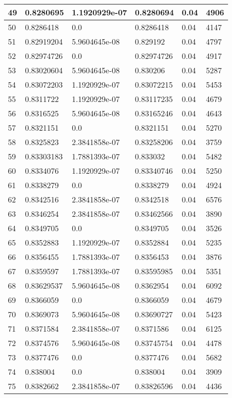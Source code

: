 \begin{longtable}{|l|l|l|l|l|l|}
49 & 0.8280695 & 1.1920929e-07 & 0.8280694 & 0.04 & 4906 \\ \hline 
50 & 0.8286418 & 0.0 & 0.8286418 & 0.04 & 4147 \\ \hline 
51 & 0.82919204 & 5.9604645e-08 & 0.829192 & 0.04 & 4797 \\ \hline 
52 & 0.82974726 & 0.0 & 0.82974726 & 0.04 & 4917 \\ \hline 
53 & 0.83020604 & 5.9604645e-08 & 0.830206 & 0.04 & 5287 \\ \hline 
54 & 0.83072203 & 1.1920929e-07 & 0.83072215 & 0.04 & 5453 \\ \hline 
55 & 0.8311722 & 1.1920929e-07 & 0.83117235 & 0.04 & 4679 \\ \hline 
56 & 0.8316525 & 5.9604645e-08 & 0.83165246 & 0.04 & 4643 \\ \hline 
57 & 0.8321151 & 0.0 & 0.8321151 & 0.04 & 5270 \\ \hline 
58 & 0.8325823 & 2.3841858e-07 & 0.83258206 & 0.04 & 3759 \\ \hline 
59 & 0.83303183 & 1.7881393e-07 & 0.833032 & 0.04 & 5482 \\ \hline 
60 & 0.8334076 & 1.1920929e-07 & 0.83340746 & 0.04 & 5250 \\ \hline 
61 & 0.8338279 & 0.0 & 0.8338279 & 0.04 & 4924 \\ \hline 
62 & 0.8342516 & 2.3841858e-07 & 0.8342518 & 0.04 & 6576 \\ \hline 
63 & 0.8346254 & 2.3841858e-07 & 0.83462566 & 0.04 & 3890 \\ \hline 
64 & 0.8349705 & 0.0 & 0.8349705 & 0.04 & 3526 \\ \hline 
65 & 0.8352883 & 1.1920929e-07 & 0.8352884 & 0.04 & 5235 \\ \hline 
66 & 0.8356455 & 1.7881393e-07 & 0.8356453 & 0.04 & 3876 \\ \hline 
67 & 0.8359597 & 1.7881393e-07 & 0.83595985 & 0.04 & 5351 \\ \hline 
68 & 0.83629537 & 5.9604645e-08 & 0.8362954 & 0.04 & 6092 \\ \hline 
69 & 0.8366059 & 0.0 & 0.8366059 & 0.04 & 4679 \\ \hline 
70 & 0.8369073 & 5.9604645e-08 & 0.83690727 & 0.04 & 5423 \\ \hline 
71 & 0.8371584 & 2.3841858e-07 & 0.8371586 & 0.04 & 6125 \\ \hline 
72 & 0.8374576 & 5.9604645e-08 & 0.83745754 & 0.04 & 4478 \\ \hline 
73 & 0.8377476 & 0.0 & 0.8377476 & 0.04 & 5682 \\ \hline 
74 & 0.838004 & 0.0 & 0.838004 & 0.04 & 3909 \\ \hline 
75 & 0.8382662 & 2.3841858e-07 & 0.83826596 & 0.04 & 4436 \\ \hline 
\end{longtable}